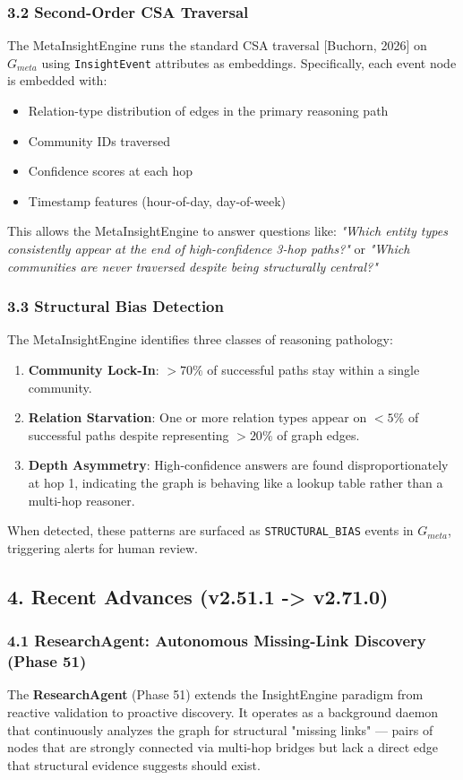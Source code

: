 \subsubsection*{3.2 Second-Order CSA Traversal}
The MetaInsightEngine runs the standard CSA traversal [Buchorn, 2026] on $G_{meta}$ using \texttt{InsightEvent} attributes as embeddings. Specifically, each event node is embedded with:
\begin{itemize}
  \item Relation-type distribution of edges in the primary reasoning path
  \item Community IDs traversed
  \item Confidence scores at each hop
  \item Timestamp features (hour-of-day, day-of-week)
\end{itemize}


This allows the MetaInsightEngine to answer questions like: \textit{"Which entity types consistently appear at the end of high-confidence 3-hop paths?"} or \textit{"Which communities are never traversed despite being structurally central?"}

\subsubsection*{3.3 Structural Bias Detection}
The MetaInsightEngine identifies three classes of reasoning pathology:
\begin{enumerate}
  \item \textbf{Community Lock-In}: $> 70\%$ of successful paths stay within a single community.
  \item \textbf{Relation Starvation}: One or more relation types appear on $< 5\%$ of successful paths despite representing $> 20\%$ of graph edges.
  \item \textbf{Depth Asymmetry}: High-confidence answers are found disproportionately at hop 1, indicating the graph is behaving like a lookup table rather than a multi-hop reasoner.
\end{enumerate}


When detected, these patterns are surfaced as \texttt{STRUCTURAL\_BIAS} events in $G_{meta}$, triggering alerts for human review.

\subsection*{4. Recent Advances (v2.51.1 -> v2.71.0)}

\subsubsection*{4.1 ResearchAgent: Autonomous Missing-Link Discovery (Phase 51)}
The \textbf{ResearchAgent} (Phase 51) extends the InsightEngine paradigm from reactive validation to proactive discovery. It operates as a background daemon that continuously analyzes the graph for structural "missing links" --- pairs of nodes that are strongly connected via multi-hop bridges but lack a direct edge that structural evidence suggests should exist.

